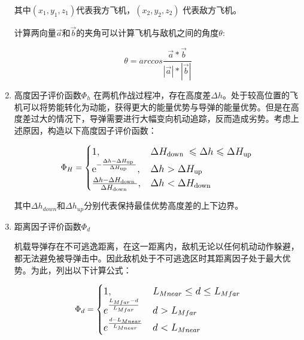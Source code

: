 \documentclass{my_paper}
\begin{document}
\begin{enumerate}
    其中$ (x_1,y_1,z_1) $代表我方飞机，$ (x_2,y_2,z_2) $ 代表敌方飞机。

    计算两向量$ \vec{a} $和$ \vec{b} $的夹角可以计算飞机与敌机之间的角度$ \theta $:

    \begin{equation}
    \theta = arccos\frac{\vec{a}*\vec{b}}{|\vec{a}|*|\vec{b}|}
    \end{equation}

    \item 高度因子评价函数$\Phi _{h}$
    在两机作战过程冲，存在高度差$\Delta h$。处于较高位置的飞机可以将势能转化为动能，获得更大的能量优势与导弹的能量优势。但是在高度差过大的情况下，导弹需要进行大幅变向机动追踪，反而造成劣势。考虑上述原因，构造以下高度因子评价函数：

    \begin{equation}
        \large\Phi_{H}= \begin{cases}1, &  \Delta H_{\text {down }} \leqslant \Delta h \leqslant  \Delta H_{\text {up }} \\ \mathrm{e}^{-\frac{\Delta h - \Delta H_{\text {up }}}{\Delta H_{\text {up }}}}, & \Delta h> \Delta H_{\text {up }} \\ \frac{\Delta h- \Delta H_{\text {down }}}{\Delta H_{\text {down }}}, & \Delta h< \Delta H_{\text {down }}\end{cases}
    \end{equation}

    其中$ \Delta h _{down} $和$ \Delta h _{up} $分别代表保持最佳优势高度差的上下边界。

    
    \item 距离因子评价函数$\Phi _{d}$
    
    机载导弹存在不可逃逸距离\cite{10}，在这一距离内，敌机无论以任何机动动作躲避，都无法避免被导弹击中。因此敌机处于不可逃逸区时其距离因子处于最大优势。为此，列出以下计算公式：

    \begin{equation}
        \large\Phi_{d}=\begin{cases}1,&L_{Mnear}\leq d \leq L_{Mfar}\\e^{\frac{L_{Mfar}-d}{L_{Mfar}}} &d>L_{Mfar}\\e^{\frac{d-L_{Mnear}}{L_{Mnear}}} &d<L_{Mnear}\end{cases}
    \end{equation}
    

\end{enumerate}
\end{document}
